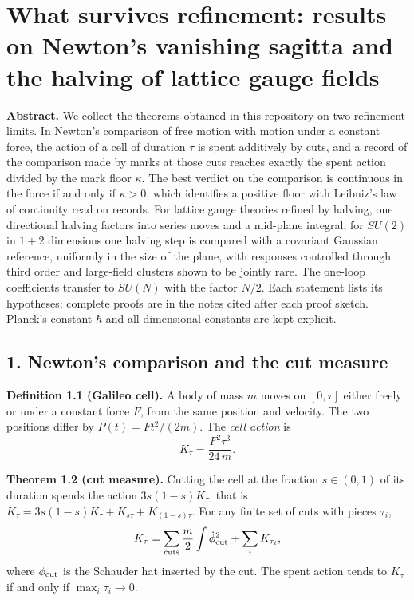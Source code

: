 \documentclass[11pt,a4paper]{article}
\begin{document}
\hypertarget{what-survives-refinement-results-on-newtons-vanishing-sagitta-and-the-halving-of-lattice-gauge-fields}{%
\section{What survives refinement: results on Newton's vanishing sagitta
and the halving of lattice gauge
fields}\label{what-survives-refinement-results-on-newtons-vanishing-sagitta-and-the-halving-of-lattice-gauge-fields}}

\textbf{Abstract.} We collect the theorems obtained in this repository
on two refinement limits. In Newton's comparison of free motion with
motion under a constant force, the action of a cell of duration \(\tau\)
is spent additively by cuts, and a record of the comparison made by
marks at those cuts reaches exactly the spent action divided by the mark
floor \(\kappa\). The best verdict on the comparison is continuous in
the force if and only if \(\kappa>0\), which identifies a positive floor
with Leibniz's law of continuity read on records. For lattice gauge
theories refined by halving, one directional halving factors into series
moves and a mid-plane integral; for \(SU(2)\) in \(1+2\) dimensions one
halving step is compared with a covariant Gaussian reference, uniformly
in the size of the plane, with responses controlled through third order
and large-field clusters shown to be jointly rare. The one-loop
coefficients transfer to \(SU(N)\) with the factor \(N/2\). Each
statement lists its hypotheses; complete proofs are in the notes cited
after each proof sketch. Planck's constant \(\hbar\) and all dimensional
constants are kept explicit.

\hypertarget{newtons-comparison-and-the-cut-measure}{%
\subsection{1. Newton's comparison and the cut
measure}\label{newtons-comparison-and-the-cut-measure}}

\textbf{Definition 1.1 (Galileo cell).} A body of mass \(m\) moves on
\([0,\tau]\) either freely or under a constant force \(F\), from the
same position and velocity. The two positions differ by
\(P(t)=Ft^2/(2m)\). The \emph{cell action} is
\[K_\tau=\frac{F^2\tau^3}{24\,m}.\]

\textbf{Theorem 1.2 (cut measure).} Cutting the cell at the fraction
\(s\in(0,1)\) of its duration spends the action \(3s(1-s)K_\tau\), that
is \(K_\tau=3s(1-s)K_\tau+K_{s\tau}+K_{(1-s)\tau}\). For any finite set
of cuts with pieces \(\tau_i\),
\[K_\tau=\sum_{\rm cuts}\frac m2\int\dot\phi_{\rm cut}^2+\sum_iK_{\tau_i},\]
where \(\phi_{\rm cut}\) is the Schauder hat inserted by the cut. The
spent action tends to \(K_\tau\) if and only if \(\max_i\tau_i\to0\).
\end{document}
